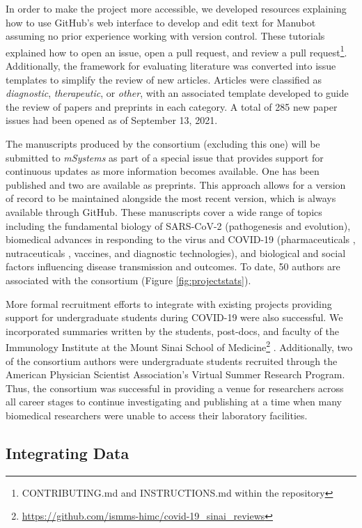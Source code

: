 \documentclass[twocolumn]{ceurart}
\begin{document}
In order to make the project more accessible, we developed resources explaining how to use GitHub's web interface to develop and edit text for Manubot assuming no prior experience working with version control.
These tutorials explained how to open an issue, open a pull request, and review a pull request\footnote{CONTRIBUTING.md and INSTRUCTIONS.md within the
  repository}.
Additionally, the framework for evaluating literature was converted into issue templates to simplify the review of new articles.
Articles were classified as \emph{diagnostic}, \emph{therapeutic}, or \emph{other}, with an associated template developed to guide the review of papers and preprints in each category.
A total of 285 new paper issues had been opened as of September 13, 2021.

The manuscripts produced by the consortium (excluding this one) will be submitted to \emph{mSystems} as part of a special issue that provides support for continuous updates as more information becomes available.
One has been published and two are available as preprints.
This approach allows for a version of record to be maintained alongside the most recent version, which is always available through GitHub.
These manuscripts cover a wide range of topics including the fundamental biology of SARS-CoV-2 (pathogenesis \citep{r366f5T3} and evolution), biomedical advances in responding to the virus and COVID-19 (pharmaceuticals \citep{cifK9B8t}, nutraceuticals \citep{wgAGKcBj}, vaccines, and diagnostic technologies), and biological and social factors influencing disease transmission and outcomes.
To date, 50 authors are associated with the consortium (Figure \ref{fig:projectstats}).

More formal recruitment efforts to integrate with existing projects providing support for undergraduate students during COVID-19 were also successful.
We incorporated summaries written by the students, post-docs, and faculty of the Immunology Institute at the Mount Sinai School of Medicine\footnote{\url{https://github.com/ismms-himc/covid-19_sinai_reviews}} \citep{YZ4cHNuH}.
Additionally, two of the consortium authors were undergraduate students recruited through the American Physician Scientist Association's Virtual Summer Research Program.
Thus, the consortium was successful in providing a venue for researchers across all career stages to continue investigating and publishing at a time when many biomedical researchers were unable to access their laboratory facilities.

\hypertarget{integrating-data}{%
\subsection{Integrating Data}\label{integrating-data}}
\end{document}
